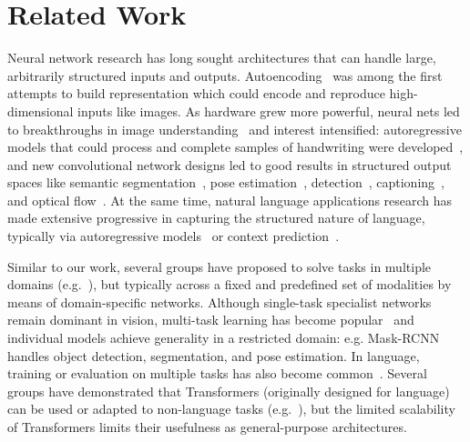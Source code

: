 \documentclass{article} \usepackage{iclr2022_conference,times}
\begin{document}
\section{Related Work}

Neural network research has long sought architectures that can handle large, arbitrarily structured inputs and outputs. Autoencoding~\citep{hinton1994autoencoders} was among the first attempts to build representation which could encode and reproduce high-dimensional inputs like images. As hardware grew more powerful, neural nets led to breakthroughs in image understanding~\citep{krizhevsky2012imagenet, zeiler2014visualizing, szegedy2015going} and interest intensified: autoregressive models that could process and complete samples of handwriting were developed~\citep{graves2013generating}, and new convolutional network designs led to good results in structured output spaces like semantic segmentation~\citep{farabet2012learning,long2015fully,ronnenberger2015convolutional}, pose estimation~\citep{toshev2014deep}, detection~\citep{sermanet2014overfeat}, captioning~\citep{you2016image}, and optical flow~\citep{fischer2015flownet}. At the same time, natural language applications research has made extensive progressive in capturing the structured nature of language, typically via autoregressive models~\citep{collobert2011natural,sutskever2014sequence,vaswani2017attention,radford2019language, brown2020language} or context prediction~\citep{mikolov2013distributed, pennington2014glove, devlin2019bert}.

Similar to our work, several groups have proposed to solve tasks in multiple domains (e.g.~\citealt{kaiser2017one, alayrac2020self,akbari2021vatt}), but typically across a fixed and predefined set of modalities by means of domain-specific networks. Although single-task specialist networks remain dominant in vision, multi-task learning has become popular~\citep{misra2016cross,doersch2017multi,kokkinos2017ubernet,zamir2018taskonomy} and individual models achieve generality in a restricted domain: e.g. Mask-RCNN~\citep{he2017mask} handles object detection, segmentation, and pose estimation. In language, training or evaluation on multiple tasks has also become common~\citep{collobert2008unified,luong2015multi,devlin2019bert,liu2019roberta, raffell2020exploring}. Several groups have demonstrated that Transformers (originally designed for language) can be used or adapted to non-language tasks (e.g.~\citealt{chen2020generative, lu2021pretrained}), but the limited scalability of Transformers limits their usefulness as general-purpose architectures. 
\end{document}
